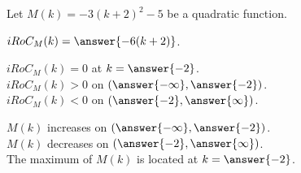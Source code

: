 \documentclass{ximera}
\author{Lee Wayand}
\begin{document}
\begin{exercise} 









Let $M(k) = -3(k+2)^2 - 5$ be a quadratic function. \\




\begin{question}



$iRoC_M(k) = \answer{-6(k+2)}$. \\

\end{question}






\begin{question}



$iRoC_M(k) = 0$  at  $k = \answer{-2}$. \\


$iRoC_M(k) > 0$ on $\left( \answer{-\infty}, \answer{-2} \right)$. \\


$iRoC_M(k) < 0$ on $\left( \answer{-2}, \answer{\infty} \right)$. \\

\end{question}





\begin{question}



$M(k)$ increases on $\left( \answer{-\infty}, \answer{-2} \right)$. \\


$M(k)$ decreases on $\left( \answer{-2}, \answer{\infty} \right)$. \\


The maximum of $M(k)$ is located at  $k = \answer{-2}$. \\

\end{question}
















\end{exercise}
\end{document}
